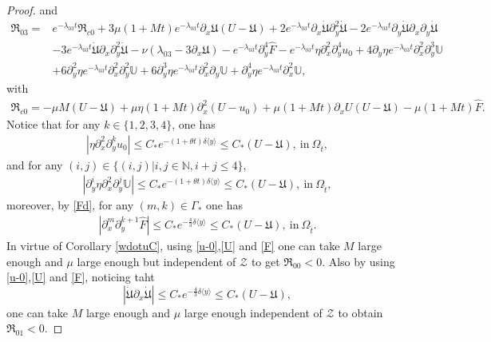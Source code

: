 \documentclass{amsart}
\numberwithin{equation}{section}
\newcommand\y{{{\langle y \rangle}}}
\begin{document}
\begin{proof}
and
\begin{align*}
\mathfrak{R}_{03}
=& e^{-\lambda_{03}t}\mathfrak{R}_{c0}
  +3\mu(1+Mt)e^{-\lambda_{03}t}\partial_{x}\mathfrak{U}(U-\mathfrak{U})
  +2e^{-\lambda_{03}t}\partial_{x}\dot{\mathfrak{U}}\partial_{y}^{2}\dot{\mathfrak{U}}
  -2e^{-\lambda_{03}t}\partial_{y}\dot{\mathfrak{U}}\partial_{x}\partial_{y}\dot{\mathfrak{U}}\\
 &-3e^{-\lambda_{03}t}\dot{\mathfrak{U}}\partial_{x}\partial_{y}^{2}\dot{\mathfrak{U}}
  -\nu(\lambda_{03}-3\partial_{x}\mathfrak{U})
  -e^{-\lambda_{03}t}\partial_{y}^{4}\hat{F}
  -e^{-\lambda_{03}t}\eta\partial_{x}^{2}\partial_{y}^{4}u_{0}
  +4\partial_{y}\eta e^{-\lambda_{03}t}\partial_{x}^{2}\partial_{y}^{3}\mathbb{U}\\
 &+6\partial_{y}^{2}\eta e^{-\lambda_{03}t}\partial_{x}^{2}\partial_{y}^{2}\mathbb{U}
  +6\partial_{y}^{3}\eta e^{-\lambda_{03}t}\partial_{x}^{2}\partial_{y}\mathbb{U}
  +\partial_{y}^{4}\eta e^{-\lambda_{03}t}\partial_{x}^{2}\mathbb{U},
\end{align*}
with
\begin{align*}
\mathfrak{R}_{c0}
= -\mu M(U-\mathfrak{U})
  +\mu\eta(1+Mt)\partial_{x}^{2}(U-u_{0})
  +\mu(1+Mt)\partial_{x}U(U-\mathfrak{U})
  -\mu(1+Mt)\hat{F}.
\end{align*}
Notice that for any $k\in\{1,2,3,4\}$, one has
\begin{align}\label{u-0}
|\eta\partial_{x}^{2}\partial_{y}^{k}u_{0}|\leq C_{*}e^{-(1+\theta t)\delta\y}\leq C_{*}(U-\mathfrak{U}),~\text{in}~\Omega_{\hat{t}},
\end{align}
and for any $(i,j)\in\{(i,j)|i,j\in\mathbb{N},i+j\leq4\}$,
\begin{align}\label{U}
|\partial_{y}^{i}\eta\partial_{x}^{2}\partial_{y}^{j}\mathbb{U}|\leq C_{*}e^{-(1+\theta t)\delta\y}
\leq C_{*}(U-\mathfrak{U}),~\text{in}~\Omega_{\hat{t}},
\end{align}
moreover, by \eqref{Fd}, for any $(m,k)\in\Gamma_{*}$ one has
\begin{align}\label{F}
|\partial_{x}^{m}\partial_{y}^{k+1}\hat{F}|
\leq C_{*}e^{-\frac{4}{3}\delta\y}
\leq C_{*}(U-\mathfrak{U}),~\text{in}~\Omega_{\hat{t}}.
\end{align}
In virtue of Corollary \ref{wdotuC}, using \eqref{u-0},\eqref{U} and \eqref{F} one can take $M$ large enough and $\mu$ large enough but independent of $\mathcal{Z}$ to get $\mathfrak{R}_{00}<0$. Also by  using \eqref{u-0},\eqref{U} and \eqref{F}, noticing taht
$$|\dot{\mathfrak{U}}\partial_{x}\dot{\mathfrak{U}}|\leq C_{*}e^{-\frac{4}{3}\delta\y}\leq C_{*}(U-\mathfrak{U}),$$
one can take $M$ large enough and $\mu$ large enough independent of $\mathcal{Z}$ to obtain $\mathfrak{R}_{01}<0$.


\end{proof}
\end{document}

